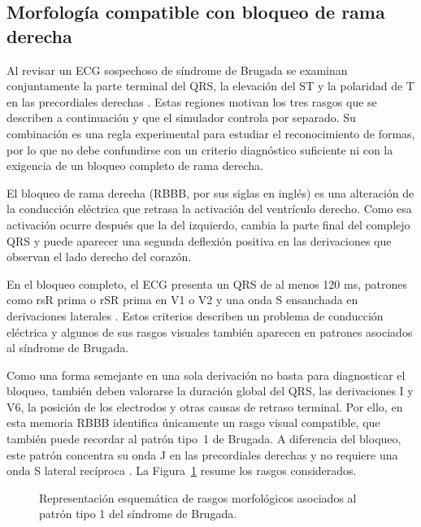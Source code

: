 \subsection{Morfología compatible con bloqueo de rama derecha}

Al revisar un ECG sospechoso de síndrome de Brugada se examinan conjuntamente la parte terminal del QRS, la elevación del ST y la polaridad de T en las precordiales derechas \cite{zeppenfeld2022,wilde2023scbt}. Estas regiones motivan los tres rasgos que se describen a continuación y que el simulador controla por separado. Su combinación es una regla experimental para estudiar el reconocimiento de formas, por lo que no debe confundirse con un criterio diagnóstico suficiente ni con la exigencia de un bloqueo completo de rama derecha.

El bloqueo de rama derecha (RBBB, por sus siglas en inglés) es una alteración de la conducción eléctrica que retrasa la activación del ventrículo derecho. Como esa activación ocurre después que la del izquierdo, cambia la parte final del complejo QRS y puede aparecer una segunda deflexión positiva en las derivaciones que observan el lado derecho del corazón.

En el bloqueo completo, el ECG presenta un QRS de al menos 120 ms, patrones como rsR prima o rSR prima en V1 o V2 y una onda S ensanchada en derivaciones laterales \cite{surawicz2009}. Estos criterios describen un problema de conducción eléctrica y algunos de sus rasgos visuales también aparecen en patrones asociados al síndrome de Brugada.

Como una forma semejante en una sola derivación no basta para diagnosticar el bloqueo, también deben valorarse la duración global del QRS, las derivaciones I y V6, la posición de los electrodos y otras causas de retraso terminal. Por ello, en esta memoria RBBB identifica únicamente un rasgo visual compatible, que también puede recordar al patrón tipo~1 de Brugada. A diferencia del bloqueo, este patrón concentra su onda J en las precordiales derechas y no requiere una onda S lateral recíproca \cite{surawicz2009}. La Figura~\ref{fig:brugada_pattern} resume los rasgos considerados.

\begin{figure}[H]
  \centering
  \caption{Representación esquemática de rasgos morfológicos asociados al patrón tipo 1 del síndrome de Brugada.}
  \label{fig:brugada_pattern}
\end{figure}

